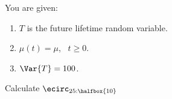 You are given:
\begin{enumerate}
  \item $T$ is the future lifetime random variable.
  \item $\mu(t)=\mu$, \ $t\geq 0$.
  \item $\Var{T}=100$.
\end{enumerate}
Calculate $\ecirc_{25:\halfbox{10}}$

